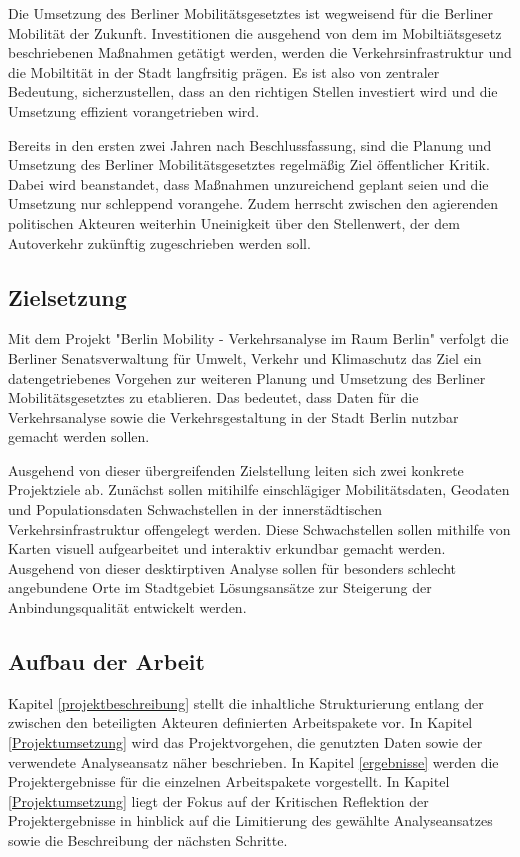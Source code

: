 Die Umsetzung des Berliner Mobilitätsgesetztes ist wegweisend für die Berliner Mobilität der Zukunft. Investitionen die ausgehend von dem im Mobiltiätsgesetz beschriebenen Maßnahmen getätigt werden, werden die Verkehrsinfrastruktur und die Mobiltität in der Stadt langfrsitig prägen. Es ist also von zentraler Bedeutung, sicherzustellen, dass an den richtigen Stellen investiert wird und die Umsetzung effizient vorangetrieben wird. 

 Bereits in den ersten zwei Jahren nach Beschlussfassung, sind die Planung und Umsetzung des Berliner Mobilitätsgesetztes regelmäßig Ziel öffentlicher Kritik. Dabei wird beanstandet, dass Maßnahmen unzureichend geplant seien und die Umsetzung nur schleppend vorangehe.  Zudem herrscht zwischen den agierenden politischen Akteuren weiterhin Uneinigkeit über den Stellenwert, der dem Autoverkehr zukünftig zugeschrieben werden soll.

\subsection{Zielsetzung}
Mit dem Projekt "Berlin Mobility - Verkehrsanalyse im Raum Berlin" verfolgt die Berliner Senatsverwaltung für Umwelt, Verkehr und Klimaschutz das Ziel ein datengetriebenes Vorgehen zur weiteren Planung und Umsetzung des Berliner Mobilitätsgesetztes zu etablieren. Das bedeutet, dass Daten für die Verkehrsanalyse sowie die Verkehrsgestaltung in der Stadt Berlin nutzbar gemacht werden sollen. 

Ausgehend von dieser übergreifenden Zielstellung leiten sich zwei konkrete Projektziele ab. Zunächst sollen mitihilfe einschlägiger Mobilitätsdaten, Geodaten und Populationsdaten Schwachstellen in der innerstädtischen Verkehrsinfrastruktur offengelegt werden. Diese Schwachstellen sollen mithilfe von Karten visuell aufgearbeitet und interaktiv erkundbar gemacht werden. Ausgehend von dieser desktirptiven Analyse sollen für besonders schlecht angebundene Orte im Stadtgebiet Lösungsansätze zur Steigerung der Anbindungsqualität entwickelt werden. 


\subsection{Aufbau der Arbeit}
Kapitel \ref{projektbeschreibung} stellt die inhaltliche Strukturierung entlang der zwischen den beteiligten Akteuren definierten Arbeitspakete vor. In Kapitel \ref{Projektumsetzung} wird das Projektvorgehen, die genutzten Daten sowie der verwendete Analyseansatz näher beschrieben. In Kapitel \ref{ergebnisse} werden die Projektergebnisse für die einzelnen Arbeitspakete vorgestellt. In Kapitel \ref{Projektumsetzung} liegt der Fokus auf der Kritischen Reflektion der Projektergebnisse in hinblick auf die Limitierung des gewählte Analyseansatzes sowie die Beschreibung der nächsten Schritte. 